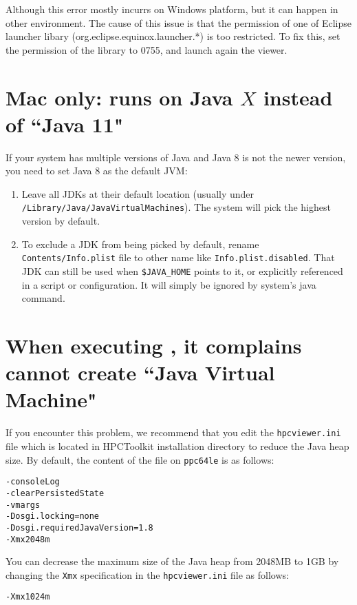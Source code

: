 \documentclass[11pt,letterpaper]{report}
\begin{document}
Although this error mostly incurrs on Windows platform, but it can happen in other environment.
The cause of this issue is that the permission of one of Eclipse launcher libary (org.eclipse.equinox.launcher.*) is too restricted.
To fix this, set the permission of the library to 0755, and launch again the viewer.



\section{Mac only: \hpcviewer{} runs on Java $X$ instead of ``Java 11"}

If your system has multiple versions of Java and Java 8 is not the newer version, you need to set Java 8 as the default JVM:

\begin{enumerate}
\item Leave all JDKs at their default location (usually under \texttt{/Library/Java/JavaVirtualMachines}). The system will pick the highest version by default.
\item To exclude a JDK from being picked by default, rename \texttt{Contents/Info.plist} file to other name like \texttt{Info.plist.disabled}. That JDK can still be used when \texttt{\$JAVA\_HOME} points to it, or explicitly referenced in a script or configuration. It will simply be ignored by system's java command.
\end{enumerate}



\section{When executing \hpcviewer, it complains cannot create ``Java Virtual Machine"}
If you encounter this problem, we recommend that you edit the
\texttt{hpcviewer.ini}
file which is located in HPCToolkit installation directory to reduce the
Java heap size.
By default, the content of the file on \verb|ppc64le| is as follows:
\begin{verbatim}
-consoleLog
-clearPersistedState
-vmargs
-Dosgi.locking=none
-Dosgi.requiredJavaVersion=1.8
-Xmx2048m
\end{verbatim}
You can decrease the maximum size of the Java heap from 2048MB to 1GB
 by changing the {\tt Xmx} specification in the \texttt{hpcviewer.ini} file as follows:
\begin{verbatim}
-Xmx1024m
\end{verbatim}
\end{document}
